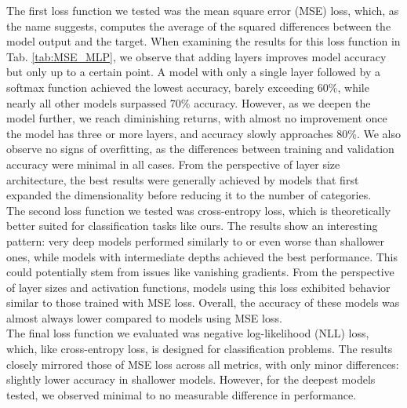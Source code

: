 The first loss function we tested was the mean square error (MSE) loss, which, as the name suggests, computes the average of the squared differences between the model output and the target. When examining the results for this loss function in Tab. \ref{tab:MSE_MLP}, we observe that adding layers improves model accuracy but only up to a certain point. A model with only a single layer followed by a softmax function achieved the lowest accuracy, barely exceeding 60\%, while nearly all other models surpassed 70\% accuracy. However, as we deepen the model further, we reach diminishing returns, with almost no improvement once the model has three or more layers, and accuracy slowly approaches 80\%. We also observe no signs of overfitting, as the differences between training and validation accuracy were minimal in all cases. From the perspective of layer size architecture, the best results were generally achieved by models that first expanded the dimensionality before reducing it to the number of categories.
\\

The second loss function we tested was cross-entropy loss, which is theoretically better suited for classification tasks like ours. The results show an interesting pattern: very deep models performed similarly to or even worse than shallower ones, while models with intermediate depths achieved the best performance. This could potentially stem from issues like vanishing gradients. From the perspective of layer sizes and activation functions, models using this loss exhibited behavior similar to those trained with MSE loss. Overall, the accuracy of these models was almost always lower compared to models using MSE loss.
\\

The final loss function we evaluated was negative log-likelihood (NLL) loss, which, like cross-entropy loss, is designed for classification problems. The results closely mirrored those of MSE loss across all metrics, with only minor differences: slightly lower accuracy in shallower models. However, for the deepest models tested, we observed minimal to no measurable difference in performance.
\\  

